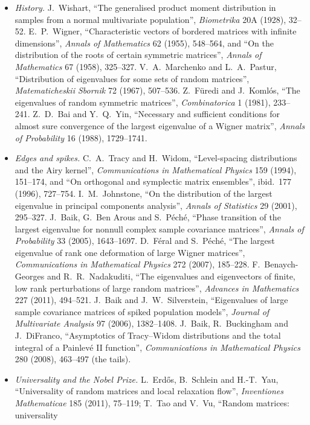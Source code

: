 \begin{itemize}
\item \emph{History.} J.~Wishart, ``The generalised product moment distribution in samples from a normal multivariate population'', \emph{Biometrika} 20A (1928), 32--52. E.~P.~Wigner, ``Characteristic vectors of bordered matrices with
infinite dimensions'', \emph{Annals of Mathematics} 62 (1955), 548--564, and ``On the distribution of the roots of certain symmetric matrices'', \emph{Annals of Mathematics} 67 (1958), 325--327. V.~A.~Marchenko and L.~A.~Pastur,
``Distribution of eigenvalues for some sets of random matrices'', \emph{Matematicheskii Sbornik} 72 (1967), 507--536. Z.~F\"uredi and J.~Koml\'os, ``The eigenvalues of random symmetric matrices'', \emph{Combinatorica} 1 (1981),
233--241. Z.~D.~Bai and Y.~Q.~Yin, ``Necessary and sufficient conditions for almost sure convergence of the largest eigenvalue of a Wigner matrix'', \emph{Annals of Probability} 16 (1988), 1729--1741.
\item \emph{Edges and spikes.} C.~A.~Tracy and H.~Widom, ``Level-spacing distributions and the Airy kernel'', \emph{Communications in Mathematical Physics} 159 (1994), 151--174, and ``On orthogonal and symplectic matrix ensembles'',
ibid.\ 177 (1996), 727--754. I.~M.~Johnstone, ``On the distribution of the largest eigenvalue in principal components analysis'', \emph{Annals of Statistics} 29 (2001), 295--327. J.~Baik, G.~Ben Arous and S.~P\'ech\'e, ``Phase transition
of the largest eigenvalue for nonnull complex sample covariance matrices'', \emph{Annals of Probability} 33 (2005), 1643--1697. D.~F\'eral and S.~P\'ech\'e, ``The largest eigenvalue of rank one deformation of large Wigner matrices'',
\emph{Communications in Mathematical Physics} 272 (2007), 185--228. F.~Benaych-Georges and R.~R.~Nadakuditi, ``The eigenvalues and eigenvectors of finite, low rank perturbations of large random matrices'', \emph{Advances in
Mathematics} 227 (2011), 494--521. J.~Baik and J.~W.~Silverstein, ``Eigenvalues of large sample covariance matrices of spiked population models'', \emph{Journal of Multivariate Analysis} 97 (2006), 1382--1408. J.~Baik, R.~Buckingham and
J.~DiFranco, ``Asymptotics of Tracy--Widom distributions and the total integral of a Painlev\'e II function'', \emph{Communications in Mathematical Physics} 280 (2008), 463--497 (the tails).
\item \emph{Universality and the Nobel Prize.} L.~Erd\H{o}s, B.~Schlein and H.-T.~Yau, ``Universality of random matrices and local relaxation flow'', \emph{Inventiones Mathematicae} 185 (2011), 75--119; T.~Tao and V.~Vu, ``Random matrices: universality

\end{itemize}
